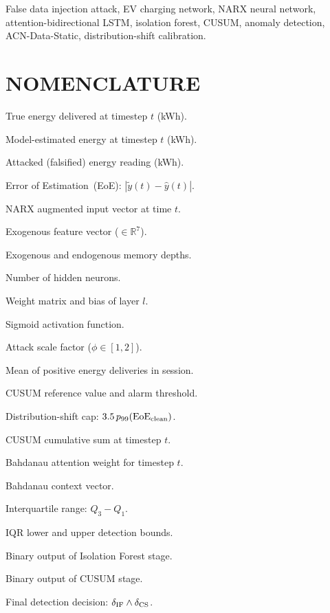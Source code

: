 \documentclass[journal]{IEEEtran}
\begin{document}
\begin{IEEEkeywords}
False data injection attack, EV charging network, NARX neural
network, attention-bidirectional LSTM, isolation forest, CUSUM,
anomaly detection, ACN-Data-Static, distribution-shift calibration.
\end{IEEEkeywords}

\section*{NOMENCLATURE}
\begin{IEEEdescription}
\item[$y(t)$]       True energy delivered at timestep $t$ (kWh).
\item[$\hat{y}(t)$] Model-estimated energy at timestep $t$ (kWh).
\item[$\tilde{y}(t)$] Attacked (falsified) energy reading (kWh).
\item[$\varepsilon(t)$] Error of Estimation~(EoE): $|\tilde{y}(t)-\hat{y}(t)|$.
\item[$\mathbf{U}(t)$]  NARX augmented input vector at time $t$.
\item[$\mathbf{x}(t)$]  Exogenous feature vector ($\in\mathbb{R}^7$).
\item[$p,\,q$]       Exogenous and endogenous memory depths.
\item[$n_h$]         Number of hidden neurons.
\item[$\mathbf{W}^{(l)},\mathbf{b}^{(l)}$] Weight matrix and bias of layer $l$.
\item[$\sigma(\cdot)$] Sigmoid activation function.
\item[$\phi$]        Attack scale factor ($\phi\in[1,2]$).
\item[$\mu_+$]       Mean of positive energy deliveries in session.
\item[$k,\,h$]       CUSUM reference value and alarm threshold.
\item[$h_{\rm cap}$] Distribution-shift cap: $3.5\,p_{99}(\text{EoE}_{\rm clean})$.
\item[$S(t)$]        CUSUM cumulative sum at timestep $t$.
\item[$\alpha_t$]    Bahdanau attention weight for timestep $t$.
\item[$\mathbf{c}$]  Bahdanau context vector.
\item[IQR]           Interquartile range: $Q_3 - Q_1$.
\item[$\text{LB},\text{UB}$] IQR lower and upper detection bounds.
\item[$\delta_{\rm IF}$] Binary output of Isolation Forest stage.
\item[$\delta_{\rm CS}$] Binary output of CUSUM stage.
\item[$\delta$]      Final detection decision: $\delta_{\rm IF} \wedge \delta_{\rm CS}$.
\end{IEEEdescription}
\end{document}
